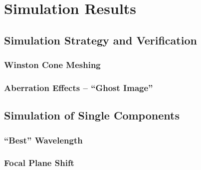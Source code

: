\chapter{Simulation Results}

\section{Simulation Strategy and Verification}

\subsection{Winston Cone Meshing}\label{sec:wico_meshing}

\subsection{Aberration Effects -- \enquote{Ghost Image}}

\section{Simulation of Single Components}

\subsection{\enquote{Best} Wavelength}

\subsection{Focal Plane Shift}